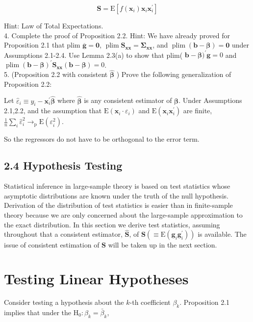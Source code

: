 \documentclass[10pt]{article}
\begin{document}
$$
\mathbf{S}=\mathrm{E}\left[f\left(\mathbf{x}_{i}\right) \mathbf{x}_{i} \mathbf{x}_{i}^{\prime}\right]
$$

Hint: Law of Total Expectations.\\
4. Complete the proof of Proposition 2.2. Hint: We have already proved for Proposition 2.1 that plim $\overline{\mathbf{g}}=\mathbf{0}$, $\operatorname{plim} \mathbf{S}_{\mathbf{x x}}=\boldsymbol{\Sigma}_{\mathbf{x x}}$, and $\operatorname{plim}(\mathbf{b}-\boldsymbol{\beta})=\mathbf{0}$ under Assumptions 2.1-2.4. Use Lemma 2.3(a) to show that plim( $\mathbf{b}-\boldsymbol{\beta})^{\prime} \mathbf{g}=0$ and $\operatorname{plim}(\mathbf{b}-\boldsymbol{\beta})^{\prime} \mathbf{S}_{\mathbf{x x}}(\mathbf{b}-\boldsymbol{\beta})=0$.\\
5. (Proposition 2.2 with consistent $\widehat{\boldsymbol{\beta}}$ ) Prove the following generalization of Proposition 2.2:

Let $\hat{\varepsilon}_{i} \equiv y_{i}-\mathbf{x}_{i}^{\prime} \widehat{\boldsymbol{\beta}}$ where $\widehat{\boldsymbol{\beta}}$ is any consistent estimator of $\boldsymbol{\beta}$. Under Assumptions 2.1,2.2, and the assumption that $\mathrm{E}\left(\mathbf{x}_{i} \cdot \varepsilon_{i}\right)$ and $\mathrm{E}\left(\mathbf{x}_{i} \mathbf{x}_{i}^{\prime}\right)$ are finite, $\frac{1}{n} \sum_{i} \hat{\varepsilon}_{i}^{2} \rightarrow_{\mathrm{p}} \mathrm{E}\left(\varepsilon_{i}^{2}\right)$.

So the regressors do not have to be orthogonal to the error term.

\subsection*{2.4 Hypothesis Testing}
Statistical inference in large-sample theory is based on test statistics whose asymptotic distributions are known under the truth of the null hypothesis. Derivation of the distribution of test statistics is easier than in finite-sample theory because we are only concerned about the large-sample approximation to the exact distribution. In this section we derive test statistics, assuming throughout that a consistent estimator, $\widehat{\mathbf{S}}$, of $\mathbf{S}\left(\equiv \mathrm{E}\left(\mathbf{g}_{i} \mathbf{g}_{i}^{\prime}\right)\right)$ is available. The issue of consistent estimation of $\mathbf{S}$ will be taken up in the next section.

\section*{Testing Linear Hypotheses}
Consider testing a hypothesis about the $k$-th coefficient $\beta_{k}$. Proposition 2.1 implies that under the $\mathrm{H}_{0}: \beta_{k}=\bar{\beta}_{k}$,
\end{document}
